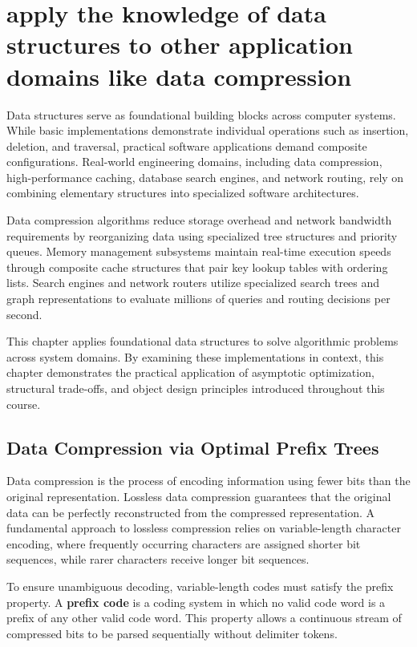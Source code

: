 \documentclass[12pt]{report}
\begin{document}
\pagestyle{plain}
\setcounter{page}{50}
\setcounter{chapter}{5}
\chapter{apply the knowledge of data structures to other application domains like data compression}

Data structures serve as foundational building blocks across computer systems. While basic implementations demonstrate individual operations such as insertion, deletion, and traversal, practical software applications demand composite configurations. Real-world engineering domains, including data compression, high-performance caching, database search engines, and network routing, rely on combining elementary structures into specialized software architectures.

Data compression algorithms reduce storage overhead and network bandwidth requirements by reorganizing data using specialized tree structures and priority queues. Memory management subsystems maintain real-time execution speeds through composite cache structures that pair key lookup tables with ordering lists. Search engines and network routers utilize specialized search trees and graph representations to evaluate millions of queries and routing decisions per second.

This chapter applies foundational data structures to solve algorithmic problems across system domains. By examining these implementations in context, this chapter demonstrates the practical application of asymptotic optimization, structural trade-offs, and object design principles introduced throughout this course.

\section{Data Compression via Optimal Prefix Trees}

Data compression is the process of encoding information using fewer bits than the original representation. Lossless data compression guarantees that the original data can be perfectly reconstructed from the compressed representation. A fundamental approach to lossless compression relies on variable-length character encoding, where frequently occurring characters are assigned shorter bit sequences, while rarer characters receive longer bit sequences.

To ensure unambiguous decoding, variable-length codes must satisfy the prefix property. A \textbf{prefix code} is a coding system in which no valid code word is a prefix of any other valid code word. This property allows a continuous stream of compressed bits to be parsed sequentially without delimiter tokens.
\end{document}
